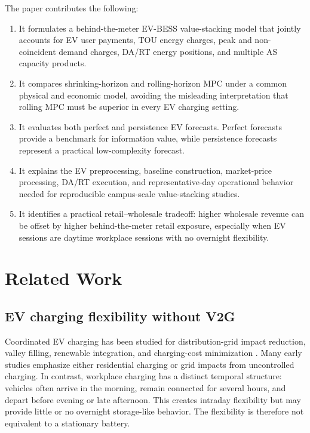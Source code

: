 \documentclass[final,5p,times]{elsarticle}
\begin{document}
The paper contributes the following:
\begin{enumerate}[leftmargin=*]
\item It formulates a behind-the-meter EV-BESS value-stacking model that jointly accounts for EV user payments, TOU energy charges, peak and non-coincident demand charges, DA/RT energy positions, and multiple AS capacity products.
\item It compares shrinking-horizon and rolling-horizon MPC under a common physical and economic model, avoiding the misleading interpretation that rolling MPC must be superior in every EV charging setting.
\item It evaluates both perfect and persistence EV forecasts. Perfect forecasts provide a benchmark for information value, while persistence forecasts represent a practical low-complexity forecast.
\item It explains the EV preprocessing, baseline construction, market-price processing, DA/RT execution, and representative-day operational behavior needed for reproducible campus-scale value-stacking studies.
\item It identifies a practical retail--wholesale tradeoff: higher wholesale revenue can be offset by higher behind-the-meter retail exposure, especially when EV sessions are daytime workplace sessions with no overnight flexibility.
\end{enumerate}

\section{Related Work}
\label{sec:related_work}

\subsection{EV charging flexibility without V2G}
Coordinated EV charging has been studied for distribution-grid impact reduction, valley filling, renewable integration, and charging-cost minimization \cite{clement2010impact,sortomme2011optimal,gan2013optimal,richardson2013electric,mwasilu2014electric}. Many early studies emphasize either residential charging or grid impacts from uncontrolled charging. In contrast, workplace charging has a distinct temporal structure: vehicles often arrive in the morning, remain connected for several hours, and depart before evening or late afternoon. This creates intraday flexibility but may provide little or no overnight storage-like behavior. The flexibility is therefore not equivalent to a stationary battery.
\end{document}
